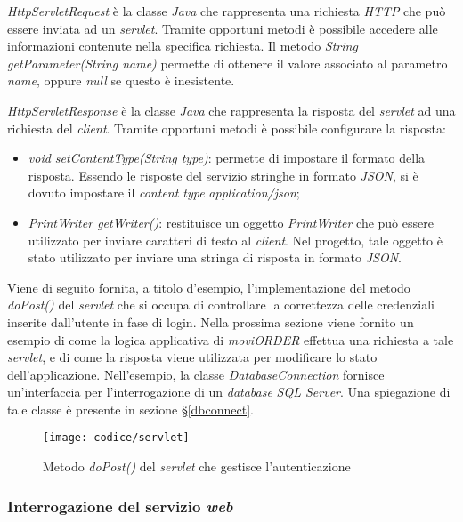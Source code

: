 \textit{HttpServletRequest} è la classe \textit{Java} che rappresenta una richiesta \textit{HTTP} che può essere inviata ad un \textit{servlet}. Tramite opportuni metodi è possibile accedere alle informazioni contenute nella specifica richiesta. Il metodo \textit{String getParameter(String name)} permette di ottenere il valore associato al parametro \textit{name}, oppure \textit{null} se questo è inesistente.

\textit{HttpServletResponse} è la classe \textit{Java} che rappresenta la risposta del \textit{servlet} ad una richiesta del \textit{client}. Tramite opportuni metodi è possibile configurare la risposta:
\begin{itemize}
	\item \textit{void setContentType(String type)}: permette di impostare il formato della risposta. Essendo le risposte del servizio stringhe in formato \textit{JSON}, si è dovuto impostare il \textit{content type} \textit{application/json};
	\item \textit{PrintWriter getWriter()}: restituisce un oggetto \textit{PrintWriter} che può essere utilizzato per inviare caratteri di testo al \textit{client}. Nel progetto, tale oggetto è stato utilizzato per inviare una stringa di risposta in formato \textit{JSON}.
\end{itemize}

Viene di seguito fornita, a titolo d'esempio, l'implementazione del metodo \textit{doPost()} del \textit{servlet} che si occupa di controllare la correttezza delle credenziali inserite dall'utente in fase di login. Nella prossima sezione viene fornito un esempio di come la logica applicativa di \textit{moviORDER} effettua una richiesta a tale \textit{servlet}, e di come la risposta viene utilizzata per modificare lo stato dell'applicazione. Nell'esempio, la classe \textit{DatabaseConnection} fornisce un'interfaccia per l'interrogazione di un \textit{database} \textit{SQL Server}. Una spiegazione di tale classe è presente in sezione §\ref{dbconnect}.

\begin{figure}[!h] 
    \centering 
    \texttt{[image: codice/servlet]} 
    \caption{Metodo \textit{doPost()} del \textit{servlet} che gestisce l'autenticazione}
\end{figure}

\subsubsection{Interrogazione del servizio \textit{web}}

